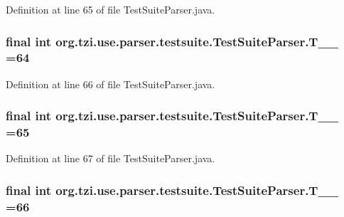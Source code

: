Definition at line 65 of file Test\-Suite\-Parser.\-java.

\hypertarget{classorg_1_1tzi_1_1use_1_1parser_1_1testsuite_1_1_test_suite_parser_a576f4ef17039320932b5057a5d1338c8}{
\subsubsection[{T\-\_\-\-\_\-64}]{\setlength{\rightskip}{0pt plus 5cm}final int org.\-tzi.\-use.\-parser.\-testsuite.\-Test\-Suite\-Parser.\-T\-\_\-\-\_ =64\hspace{0.3cm}{\ttfamily [static]}}}\label{classorg_1_1tzi_1_1use_1_1parser_1_1testsuite_1_1_test_suite_parser_a576f4ef17039320932b5057a5d1338c8}


Definition at line 66 of file Test\-Suite\-Parser.\-java.

\hypertarget{classorg_1_1tzi_1_1use_1_1parser_1_1testsuite_1_1_test_suite_parser_a5de642bacb58680ca59c810713ca6c98}{
\subsubsection[{T\-\_\-\-\_\-65}]{\setlength{\rightskip}{0pt plus 5cm}final int org.\-tzi.\-use.\-parser.\-testsuite.\-Test\-Suite\-Parser.\-T\-\_\-\-\_ =65\hspace{0.3cm}{\ttfamily [static]}}}\label{classorg_1_1tzi_1_1use_1_1parser_1_1testsuite_1_1_test_suite_parser_a5de642bacb58680ca59c810713ca6c98}


Definition at line 67 of file Test\-Suite\-Parser.\-java.

\hypertarget{classorg_1_1tzi_1_1use_1_1parser_1_1testsuite_1_1_test_suite_parser_a3eb38d8545e78efce007c7815bd37f79}{
\subsubsection[{T\-\_\-\-\_\-66}]{\setlength{\rightskip}{0pt plus 5cm}final int org.\-tzi.\-use.\-parser.\-testsuite.\-Test\-Suite\-Parser.\-T\-\_\-\-\_ =66\hspace{0.3cm}{\ttfamily [static]}}}\label{classorg_1_1tzi_1_1use_1_1parser_1_1testsuite_1_1_test_suite_parser_a3eb38d8545e78efce007c7815bd37f79}



